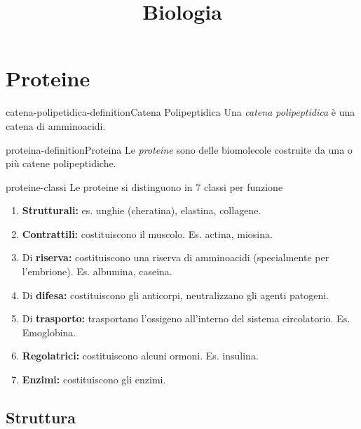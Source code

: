 \documentclass[preview]{standalone}
\begin{document}
\title{Biologia}
\genpage

\section{Proteine}



\begin{snippetdefinition}{catena-polipetidica-definition}{Catena Polipeptidica}
    Una \textit{catena polipeptidica} è una catena di amminoacidi.
\end{snippetdefinition}

\begin{snippetdefinition}{proteina-definition}{Proteina}
    Le \textit{proteine} sono delle biomolecole costruite
    da una o più catene polipeptidiche.
\end{snippetdefinition}

\begin{snippet}{proteine-classi}
    Le proteine si distinguono in 7 classi per funzione
    \begin{enumerate}
        \item \textbf{Strutturali:} es. unghie (cheratina), elastina, collagene.
        \item \textbf{Contrattili:} costituiscono il muscolo. Es. actina, miosina.
        \item Di \textbf{riserva:} costituiscono una riserva di amminoacidi (specialmente per l'embrione).
        Es. albumina, caseina.
        \item Di \textbf{difesa:} costituiscono gli anticorpi, neutralizzano gli agenti patogeni.
        \item Di \textbf{trasporto:} trasportano l'ossigeno all'interno del sistema circolatorio. Es. Emoglobina.
        \item \textbf{Regolatrici:} costituiscono alcuni ormoni. Es. insulina.
        \item \textbf{Enzimi:} costituiscono gli enzimi.
    \end{enumerate}
\end{snippet}

\subsection{Struttura}

\end{document}
